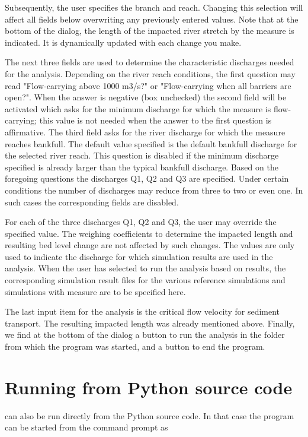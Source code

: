 Subsequently, the user specifies the branch and reach.
Changing this selection will affect all fields below overwriting any previously entered values.
Note that at the bottom of the dialog, the length  of the impacted river stretch by the measure is indicated.
It is dynamically updated with each change you make.

The next three fields are used to determine the characteristic discharges needed for the analysis.
Depending on the river reach conditions, the first question may read "Flow-carrying above 1000 m3/s?" or "Flow-carrying when all barriers are open?".
When the answer is negative (box unchecked) the second field will be activated which asks for the minimum discharge  for which the measure is flow-carrying; this value is not needed when the answer to the first question is affirmative.
The third field asks for the river discharge  for which the measure reaches bankfull.
The default value specified is the default bankfull discharge for the selected river reach.
This question is disabled if the minimum discharge specified is already larger than the typical bankfull discharge.
Based on the foregoing questions the discharges Q1, Q2 and Q3 are specified.
Under certain conditions the number of discharges may reduce from three to two or even one.
In such cases the corresponding fields are disabled.

For each of the three discharges Q1, Q2 and Q3, the user may override the specified value.
The weighing coefficients to determine the impacted length and resulting bed level change are not affected by such changes.
The values are only used to indicate the discharge for which simulation results are used in the analysis.
When the user has selected to run the analysis based on \dflowfm results, the corresponding simulation result files for the various reference simulations and simulations with measure are to be specified here.

The last input item for the analysis is the critical flow velocity  for sediment transport.
The resulting impacted length  was already mentioned above.
Finally, we find at the bottom of the dialog a button to run the analysis in the folder from which the program was started, and a button to end the program.

\section{Running from Python source code}
\dfastmi can also be run directly from the Python source code.
In that case the program can be started from the command prompt as


